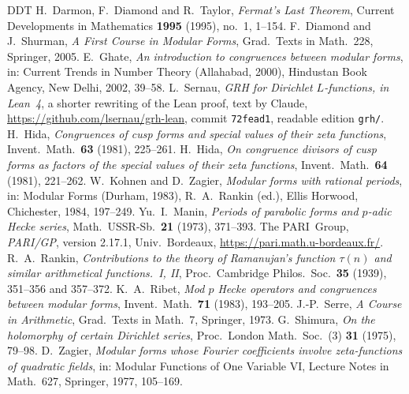 \documentclass[reqno]{amsart}
\theoremstyle{definition}
\theoremstyle{plain}
\begin{document}
\begin{thebibliography}{DDT}
 H.~Darmon, F.~Diamond and R.~Taylor, \emph{Fermat's Last Theorem}, Current Developments in Mathematics \textbf{1995} (1995), no.~1, 1--154.
 F.~Diamond and J.~Shurman, \emph{A First Course in Modular Forms}, Grad.\ Texts in Math.\ 228, Springer, 2005.
 E.~Ghate, \emph{An introduction to congruences between modular forms}, in: Current Trends in Number Theory (Allahabad, 2000), Hindustan Book Agency, New Delhi, 2002, 39--58.
 L.~Sernau, \emph{GRH for Dirichlet \(L\)-functions, in Lean~4}, a shorter rewriting of the Lean proof, text by Claude, \url{https://github.com/lsernau/grh-lean}, commit \texttt{72fead1}, readable edition \texttt{grh/}.
 H.~Hida, \emph{Congruences of cusp forms and special values of their zeta functions}, Invent.\ Math.\ \textbf{63} (1981), 225--261.
 H.~Hida, \emph{On congruence divisors of cusp forms as factors of the special values of their zeta functions}, Invent.\ Math.\ \textbf{64} (1981), 221--262.
 W.~Kohnen and D.~Zagier, \emph{Modular forms with rational periods}, in: Modular Forms (Durham, 1983), R.~A.~Rankin (ed.), Ellis Horwood, Chichester, 1984, 197--249.
 Yu.~I.~Manin, \emph{Periods of parabolic forms and \(p\)-adic Hecke series}, Math.\ USSR-Sb.\ \textbf{21} (1973), 371--393.
 The PARI~Group, \emph{PARI/GP}, version 2.17.1, Univ.\ Bordeaux, \url{https://pari.math.u-bordeaux.fr/}.
 R.~A.~Rankin, \emph{Contributions to the theory of Ramanujan's function \(\tau(n)\) and similar arithmetical functions.~I, II}, Proc.\ Cambridge Philos.\ Soc.\ \textbf{35} (1939), 351--356 and 357--372.
 K.~A.~Ribet, \emph{Mod \(p\) Hecke operators and congruences between modular forms}, Invent.\ Math.\ \textbf{71} (1983), 193--205.
 J.-P.~Serre, \emph{A Course in Arithmetic}, Grad.\ Texts in Math.\ 7, Springer, 1973.
 G.~Shimura, \emph{On the holomorphy of certain Dirichlet series}, Proc.\ London Math.\ Soc.\ (3) \textbf{31} (1975), 79--98.
 D.~Zagier, \emph{Modular forms whose Fourier coefficients involve zeta-functions of quadratic fields}, in: Modular Functions of One Variable VI, Lecture Notes in Math.\ 627, Springer, 1977, 105--169.
\end{thebibliography}
\end{document}
